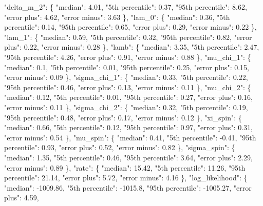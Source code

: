 {{        "delta\_m\_2": \{%
          "median": 4.01, %
          "5th percentile": 0.37, %
          "95th percentile": 8.62, %
          "error plus": 4.62, %
          "error minus": 3.63%
        \}, %
        "lam\_0": \{%
          "median": 0.36, %
          "5th percentile": 0.14, %
          "95th percentile": 0.65, %
          "error plus": 0.29, %
          "error minus": 0.22%
        \}, %
        "lam\_1": \{%
          "median": 0.59, %
          "5th percentile": 0.32, %
          "95th percentile": 0.82, %
          "error plus": 0.22, %
          "error minus": 0.28%
        \}, %
        "lamb": \{%
          "median": 3.35, %
          "5th percentile": 2.47, %
          "95th percentile": 4.26, %
          "error plus": 0.91, %
          "error minus": 0.88%
        \}, %
        "mu\_chi\_1": \{%
          "median": 0.1, %
          "5th percentile": 0.01, %
          "95th percentile": 0.25, %
          "error plus": 0.15, %
          "error minus": 0.09%
        \}, %
        "sigma\_chi\_1": \{%
          "median": 0.33, %
          "5th percentile": 0.22, %
          "95th percentile": 0.46, %
          "error plus": 0.13, %
          "error minus": 0.11%
        \}, %
        "mu\_chi\_2": \{%
          "median": 0.12, %
          "5th percentile": 0.01, %
          "95th percentile": 0.27, %
          "error plus": 0.16, %
          "error minus": 0.11%
        \}, %
        "sigma\_chi\_2": \{%
          "median": 0.32, %
          "5th percentile": 0.19, %
          "95th percentile": 0.48, %
          "error plus": 0.17, %
          "error minus": 0.12%
        \}, %
        "xi\_spin": \{%
          "median": 0.66, %
          "5th percentile": 0.12, %
          "95th percentile": 0.97, %
          "error plus": 0.31, %
          "error minus": 0.54%
        \}, %
        "mu\_spin": \{%
          "median": 0.41, %
          "5th percentile": {-}0.41, %
          "95th percentile": 0.93, %
          "error plus": 0.52, %
          "error minus": 0.82%
        \}, %
        "sigma\_spin": \{%
          "median": 1.35, %
          "5th percentile": 0.46, %
          "95th percentile": 3.64, %
          "error plus": 2.29, %
          "error minus": 0.89%
        \}, %
        "rate": \{%
          "median": 15.42, %
          "5th percentile": 11.26, %
          "95th percentile": 21.14, %
          "error plus": 5.72, %
          "error minus": 4.16%
        \}, %
        "log\_likelihood": \{%
          "median": {-}1009.86, %
          "5th percentile": {-}1015.8, %
          "95th percentile": {-}1005.27, %
          "error plus": 4.59, %
}}
